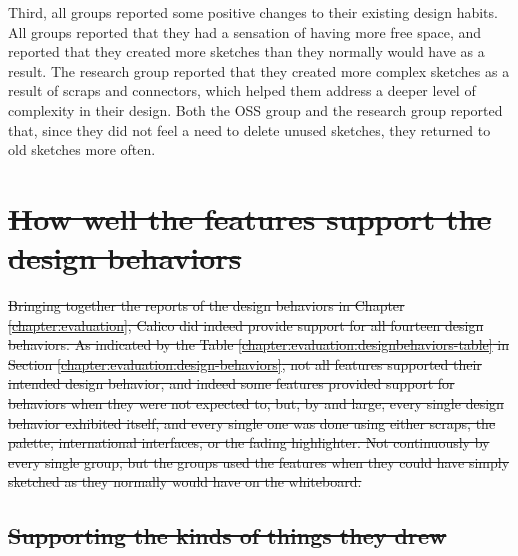 \documentclass[12pt,fleqn]{ucithesis}
\providecommand{\DIFdeltex}[1]{{\protect\color{red}\sout{#1}}}                      %
\providecommand{\DIFdelbegin}{} %
\providecommand{\DIFdel}[1]{\texorpdfstring{\DIFdeltex{#1}}{}} %
\begin{document}

Third, all groups reported some positive changes to their existing design habits. All groups reported that they had a sensation of having more free space, and reported that they created more sketches than they normally would have as a result. The research group reported that they created more complex sketches as a result of scraps and connectors, which helped them address a deeper level of complexity in their design. Both the OSS group and the research group reported that, since they did not feel a need to delete unused sketches, they returned to old sketches more often.

\DIFdelbegin \section{\DIFdel{How well the features support the design behaviors}}
\addtocounter{section}{-1}%


\DIFdel{Bringing together the reports of the design behaviors in Chapter \ref{chapter:evaluation}, Calico did indeed provide support for all fourteen design behaviors. As indicated by the Table \ref{chapter:evaluation:designbehaviors-table} in Section \ref{chapter:evaluation:design-behaviors}, not all features supported their intended design behavior, and indeed some features provided support for behaviors when they were not expected to, but, by and large, every single design behavior exhibited itself, and every single one was done using either scraps, the palette, international interfaces, or the fading highlighter. Not continuously by every single group, but the groups used the features when they could have simply sketched as they normally would have on the whiteboard. 
}%

\subsection{\DIFdel{Supporting the kinds of things they drew}}
\addtocounter{subsection}{-1}%
\end{document}
